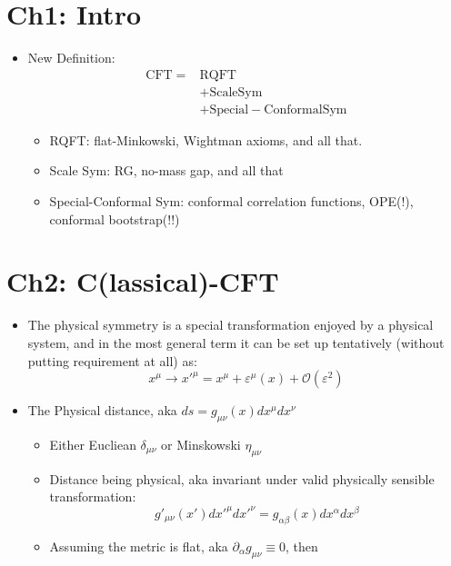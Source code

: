 \documentclass[
]{book}
\providecommand{\tightlist}{%
  \setlength{\itemsep}{0pt}\setlength{\parskip}{0pt}}
\begin{document}
\hypertarget{ch1-intro}{%
\section{Ch1: Intro}\label{ch1-intro}}

\begin{itemize}
\tightlist
\item
  New Definition:
  \begin{align}
  \mathrm{CFT}  =& \mathrm{RQFT}  \\
        &+ \mathrm{Scale Sym}\\
       &+ \mathrm{Special-Conformal Sym}
  \end{align}

  \begin{itemize}
  \tightlist
  \item
    RQFT: flat-Minkowski, Wightman axioms, and all that.
  \item
    Scale Sym: RG, no-mass gap, and all that
  \item
    Special-Conformal Sym: conformal correlation functions, OPE(!), conformal bootstrap(!!)
  \end{itemize}
\end{itemize}

\hypertarget{ch2-classical-cft}{%
\section{Ch2: C(lassical)-CFT}\label{ch2-classical-cft}}

\begin{itemize}
\tightlist
\item
  The physical symmetry is a special transformation enjoyed by a physical system, and in the most general term it can be set up tentatively (without putting requirement at all) as:
  \[
  x^\mu \rightarrow x'^\mu = x^\mu + \varepsilon^\mu(x) + \mathcal{O}(\varepsilon^2)
  \]
\item
  The Physical distance, aka \(ds = g_{\mu\nu}(x) dx^\mu dx^\nu\)

  \begin{itemize}
  \tightlist
  \item
    Either Eucliean \(\delta_{\mu\nu}\) or Minskowski \(\eta_{\mu\nu}\)
  \item
    Distance being physical, aka invariant under valid physically sensible transformation:
    \[
    g'_{\mu\nu}(x') dx'^\mu dx'^\nu = g_{\alpha\beta}(x) dx^\alpha dx^\beta
    \]
  \item
    Assuming the metric is flat, aka \(\partial_{\alpha} g_{\mu\nu} \equiv 0\), then
  \end{itemize}
\end{itemize}
\end{document}
